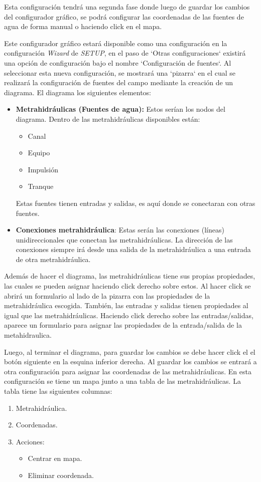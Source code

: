 Esta configuración tendrá una segunda fase donde luego de guardar los cambios del configurador gráfico, se podrá configurar las coordenadas de las fuentes de agua de forma manual o haciendo click en el mapa.

Este configurador gráfico estará disponible como una configuración en la configuración \textit{Wizard} de \textit{SETUP}, en el paso de `Otras configuraciones` existirá una opción de configuración bajo el nombre `Configuración de fuentes`.
Al seleccionar esta nueva configuración, se mostrará una `pizarra` en el cual se realizará la configuración de fuentes del campo mediante la creación de un diagrama. El diagrama los siguientes elementos:
\begin{itemize}
    \item \textbf{Metrahidráulicas (Fuentes de agua):} Estos serían los nodos del diagrama. Dentro de las metrahidráulicas disponibles están:
          \begin{itemize}
              \item Canal
              \item Equipo
              \item Impulsión
              \item Tranque
          \end{itemize}
          Estas fuentes tienen entradas y salidas, es aquí donde se conectaran con otras fuentes.
    \item \textbf{Conexiones metrahidráulica}: Estas serán las conexiones (líneas) unidireccionales que conectan las metrahidráulicas. La dirección de las conexiones siempre irá desde una salida de la metrahidráulica a una entrada de otra metrahidráulica.
\end{itemize}

Además de hacer el diagrama, las metrahidráulicas tiene sus propias propiedades, las cuales se pueden asignar haciendo click derecho sobre estos. Al hacer click se abrirá un formulario al lado de la pizarra con las propiedades de la metrahidráulica escogida.
También, las entradas y salidas tienen propiedades al igual que las metrahidráulicas. Haciendo click derecho sobre las entradas/salidas, aparece un formulario para asignar las propiedades de la entrada/salida de la metahidraulica.

Luego, al terminar el diagrama, para guardar los cambios se debe hacer click el el botón siguiente en la esquina inferior derecha. Al guardar los cambios se entrará a otra configuración para asignar las coordenadas de las metrahidráulicas.
En esta configuración se tiene un mapa junto a una tabla de las metrahidráulicas. La tabla tiene las siguientes columnas:
\begin{enumerate}
    \item Metrahidráulica.
    \item Coordenadas.
    \item Acciones:
          \begin{itemize}
            \item Centrar en mapa.
            \item Eliminar coordenada.
          \end{itemize}
\end{enumerate}

